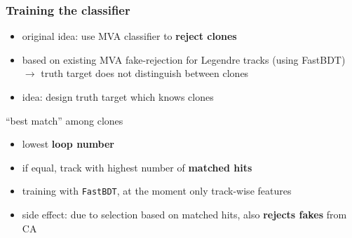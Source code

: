 \documentclass[18pt, aspectratio=169]{beamer}
\newcommand{\greenbold}[1]{\textcolor{kit-green100}{\bf{#1}}}
\begin{document}
\begin{frame}
  \frametitle{Training the classifier}
  \begin{itemize}
  \item original idea: use MVA classifier to \greenbold{reject clones}
  \item based on existing MVA fake-rejection for Legendre tracks (using FastBDT)\\
    $\rightarrow$ truth target does not distinguish between clones
  \item idea: design truth target which knows clones
  \end{itemize}
  \begin{block}{``best match'' among clones}
    \begin{itemize}
    \item lowest \textbf{loop number}
    \item if equal, track with highest number of \textbf{matched hits}
    \end{itemize}
  \end{block}
  \begin{itemize}
  \item training with \texttt{FastBDT}, at the moment only track-wise features
  \item side effect: due to selection based on matched hits, also \greenbold{rejects fakes} from CA
  \end{itemize}
\end{frame}
\end{document}
